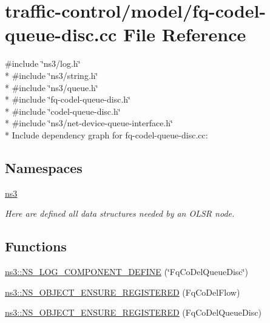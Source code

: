 \hypertarget{fq-codel-queue-disc_8cc}{}\section{traffic-\/control/model/fq-\/codel-\/queue-\/disc.cc File Reference}
\label{fq-codel-queue-disc_8cc}
{\ttfamily \#include \char`\"{}ns3/log.\+h\char`\"{}}\\*
{\ttfamily \#include \char`\"{}ns3/string.\+h\char`\"{}}\\*
{\ttfamily \#include \char`\"{}ns3/queue.\+h\char`\"{}}\\*
{\ttfamily \#include \char`\"{}fq-\/codel-\/queue-\/disc.\+h\char`\"{}}\\*
{\ttfamily \#include \char`\"{}codel-\/queue-\/disc.\+h\char`\"{}}\\*
{\ttfamily \#include \char`\"{}ns3/net-\/device-\/queue-\/interface.\+h\char`\"{}}\\*
Include dependency graph for fq-\/codel-\/queue-\/disc.cc\+:
\subsection*{Namespaces}
\begin{DoxyCompactItemize}
\item 
 \hyperlink{namespacens3}{ns3}
\begin{DoxyCompactList}\small\item\em Here are defined all data structures needed by an O\+L\+SR node. \end{DoxyCompactList}\end{DoxyCompactItemize}
\subsection*{Functions}
\begin{DoxyCompactItemize}
\item 
\hyperlink{namespacens3_ab0b871c3dde698f219104477ff4cf3de}{ns3\+::\+N\+S\+\_\+\+L\+O\+G\+\_\+\+C\+O\+M\+P\+O\+N\+E\+N\+T\+\_\+\+D\+E\+F\+I\+NE} (\char`\"{}Fq\+Co\+Del\+Queue\+Disc\char`\"{})
\item 
\hyperlink{namespacens3_ab6885fe4f0375774c53a416391e91fa0}{ns3\+::\+N\+S\+\_\+\+O\+B\+J\+E\+C\+T\+\_\+\+E\+N\+S\+U\+R\+E\+\_\+\+R\+E\+G\+I\+S\+T\+E\+R\+ED} (Fq\+Co\+Del\+Flow)
\item 
\hyperlink{namespacens3_a19951937a3f23a841dfe4985f322090d}{ns3\+::\+N\+S\+\_\+\+O\+B\+J\+E\+C\+T\+\_\+\+E\+N\+S\+U\+R\+E\+\_\+\+R\+E\+G\+I\+S\+T\+E\+R\+ED} (Fq\+Co\+Del\+Queue\+Disc)
\end{DoxyCompactItemize}
